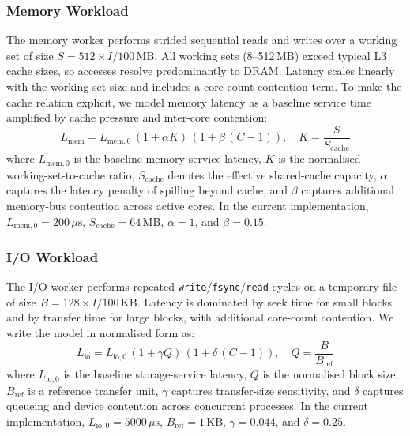 \documentclass[conference]{IEEEtran}
\begin{document}
\subsubsection{Memory Workload}
The memory worker performs strided sequential reads and writes over a
working set of size $S = 512 \times I / 100$\,MB.  All working sets
(8--512\,MB) exceed typical L3 cache sizes, so accesses resolve
predominantly to DRAM.  Latency scales linearly with the working-set size
and includes a core-count contention term.  To make the cache relation
explicit, we model memory latency as a baseline service time amplified by
cache pressure and inter-core contention:
\begin{equation}
      L_{\text{mem}} = L_{\text{mem},0}\,(1 + \alpha K)\,(1 + \beta\,(C-1)),
      \quad K = \frac{S}{S_{\text{cache}}}
\end{equation}
where $L_{\text{mem},0}$ is the baseline memory-service latency,
$K$ is the normalised working-set-to-cache ratio, $S_{\text{cache}}$
denotes the effective shared-cache capacity, $\alpha$ captures the latency
penalty of spilling beyond cache, and $\beta$ captures additional memory-bus
contention across active cores.  In the current implementation,
$L_{\text{mem},0} = 200\,\mu\text{s}$, $S_{\text{cache}} = 64$\,MB,
$\alpha = 1$, and $\beta = 0.15$.

\subsubsection{I/O Workload}
The I/O worker performs repeated \texttt{write}/\texttt{fsync}/\texttt{read}
cycles on a temporary file of size $B = 128 \times I / 100$\,KB.
Latency is dominated by seek time for small blocks and by transfer time for
large blocks, with additional core-count contention.  We write the model in
normalised form as:
\begin{equation}
      L_{\text{io}} = L_{\text{io},0}\,(1 + \gamma Q)\,(1 + \delta\,(C-1)),
      \quad Q = \frac{B}{B_{\text{ref}}}
\end{equation}
where $L_{\text{io},0}$ is the baseline storage-service latency,
$Q$ is the normalised block size, $B_{\text{ref}}$ is a reference transfer
unit, $\gamma$ captures transfer-size sensitivity, and $\delta$ captures
queueing and device contention across concurrent processes.  In the current
implementation, $L_{\text{io},0} = 5000\,\mu\text{s}$, $B_{\text{ref}} = 1$\,KB,
$\gamma = 0.044$, and $\delta = 0.25$.
\end{document}
